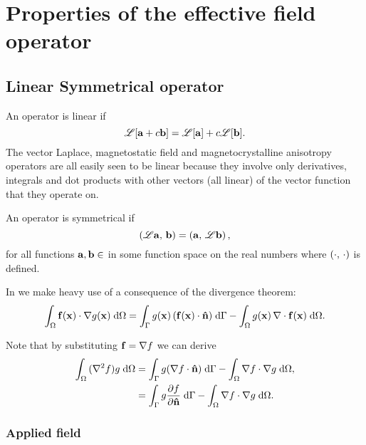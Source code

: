 \newtheorem{theorem}{Theorem}

\newcommand{\ff}{f}
\newcommand{\gf}{g}

\newcommand{\knl}{k}

\chapter{Properties of the effective field operator}
\label{sec:properties-of-field-operators}

\section{Linear Symmetrical operator}
\label{sec:linear-symm-field-operators}

An operator is linear if
\begin{equation}
  \mathscr{L}[{\mathbf{a}} + c{\mathbf{b}}] = \mathscr{L}[{\mathbf{a}}] + c\mathscr{L}[{\mathbf{b}}].
\end{equation}
The vector Laplace, magnetostatic field and magnetocrystalline anisotropy operators are all easily seen to be linear because they involve only derivatives, integrals and dot products with other vectors (all linear) of the vector function that they operate on.

An operator is symmetrical if
\begin{equation}
  \left(\mathscr{L} {\mathbf{a}},\, {\mathbf{b}} \right) = \left({\mathbf{a}},\, \mathscr{L} {\mathbf{b}} \right),
\end{equation}
for all functions ${\mathbf{a}}, {\mathbf{b}} \in $ in some function space on the real numbers where $\left(\cdot,\, \cdot \right)$ is defined.

In  we make heavy use of a consequence of the divergence theorem:
\begin{equation}
  \intd{\fv(\xv) \cdot \grad \gf(\xv)}
  = \intb{\gf(\xv) \, (\fv(\xv) \cdot \nv)} - \intd{\gf(\xv) \, \div \fv(\xv)}.
  \label{eqn:grad-divergence}
\end{equation}

Note that by substituting $\fv = \grad \ff$ we can derive
\begin{equation}
  \begin{aligned}
    \intd{(\lap \ff) \gf}
    &= \intb{\gf (\nabla \ff \cdot \nv)} - \intd{\nabla \ff \cdot \nabla \gf}, \\
    &= \intb{\gf \ddn{\ff}} - \intd{\nabla \ff \cdot \nabla \gf}.
    \label{eqn:laplace-divergence}
  \end{aligned}
\end{equation}

\subsection{Applied field}

